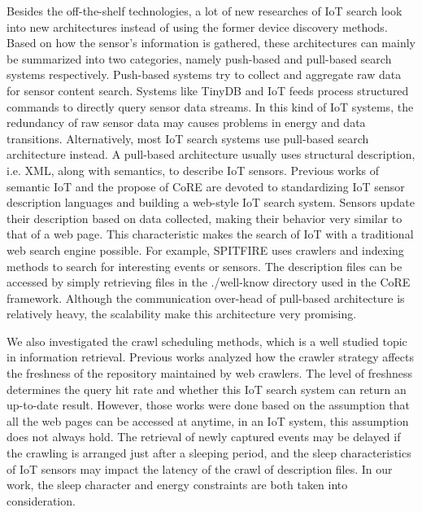 \documentclass[conference]{IEEEtran}
\begin{document}
Besides the off-the-shelf technologies, a lot of new researches of IoT search look into new architectures instead of using the former device discovery methods. 
Based on how the sensor's information is gathered, these architectures can mainly be summarized into two categories, namely push-based and pull-based search systems respectively.
Push-based systems try to collect and aggregate raw data for sensor content search.
Systems like TinyDB\cite{TinyDB} and IoT feeds\cite{Whitehouse2006} process structured commands to directly query sensor data streams. 
In this kind of IoT systems, the redundancy of raw sensor data may causes problems in energy and data transitions.
Alternatively, most IoT search systems use pull-based search architecture instead.
A pull-based architecture usually uses structural description, i.e. XML, along with semantics, to describe IoT sensors. 
Previous works of semantic IoT\cite{Compton2012} and the propose of CoRE\cite{CoREWorkingGroup2012} are devoted to standardizing IoT sensor description languages and building a web-style IoT search system. 
Sensors update their description based on data collected, making their behavior very similar to that of a web page.
This characteristic makes the search of IoT with a traditional web search engine possible. 
For example, SPITFIRE\cite{SPITFIRE} uses crawlers and indexing methods to search for interesting events or sensors. 
The description files can be accessed by simply retrieving files in the ./well-know directory used in the CoRE framework. 
Although the communication over-head of pull-based architecture is relatively heavy, the scalability make this architecture very promising.

We also investigated the crawl scheduling methods, which is a well studied topic in information retrieval. 
Previous works\cite{Cho2000}\cite{Wolf2002}\cite{Challenger2004} analyzed how the crawler strategy affects the freshness of the repository maintained by web crawlers.
The level of freshness determines the query hit rate and whether this IoT search system can return an up-to-date result. 
However, those works were done based on the assumption that all the web pages can be accessed at anytime, in an IoT system, this assumption does not always hold.
The retrieval of newly captured events may be delayed if the crawling is arranged just after a sleeping period, and the sleep characteristics of IoT sensors may impact the latency of the crawl of description files.
In our work, the sleep character and energy constraints are both taken into consideration.
\end{document}
